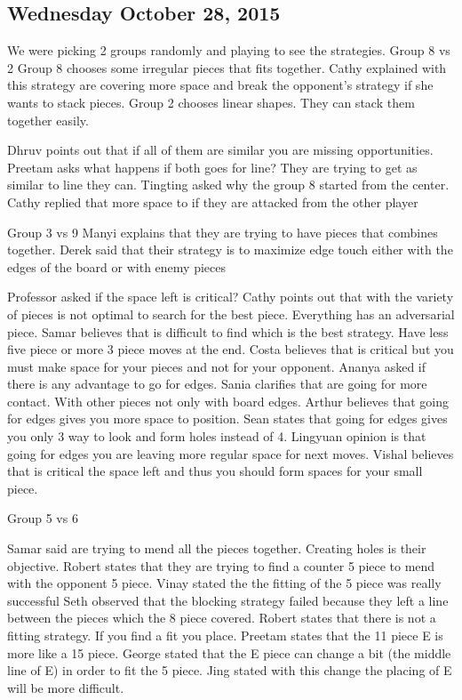 \subsection{Wednesday October 28, 2015}
We were picking 2 groups randomly and playing to see the strategies.
Group 8 vs 2
Group 8 chooses some irregular pieces that fits together.
Cathy explained with this strategy are covering more space and break the opponent’s strategy if she wants to stack pieces.
Group 2 chooses linear shapes. They can stack them together easily.

Dhruv points out that if all of them are similar you are missing opportunities.
Preetam asks what happens if both goes for line? They are trying to get as similar to line they can.
Tingting asked why the group 8 started from the center.
Cathy replied that more space to if they are attacked from the other player

Group 3 vs 9
Manyi explains that they are trying to have pieces that combines together.
Derek said that their strategy is to maximize edge touch either with the edges of the board or with enemy pieces

Professor asked if the space left is critical?
Cathy points out that with the variety of pieces is not optimal to search for the best piece. Everything has an adversarial piece.
Samar believes that is difficult to find which is the best strategy. Have less five piece or more 3 piece moves at the end.
Costa believes that is critical but you must make space for your pieces and not for your opponent.
Ananya asked if there is any advantage to go for edges.
Sania clarifies that are going for more contact. With other pieces not only with board edges.
Arthur believes that going for edges gives you more space to position.
Sean states that going for edges gives you only 3 way to look and form holes instead of 4.
Lingyuan opinion is that going for edges you are leaving more regular space for next moves.
Vishal believes that is critical the space left and thus you should form spaces for your small piece.

Group 5 vs 6

Samar said are trying to mend all the pieces together. Creating holes is their objective.
Robert states that they are trying to find a counter 5 piece to mend with the opponent 5 piece.
Vinay stated the the fitting of the 5 piece was really successful
Seth observed that the blocking strategy failed because they left a line between the pieces which the 8 piece covered.
Robert states that there is not a fitting strategy. If you find a fit you place.
Preetam states that the 11 piece E is more like a 15 piece.
George stated that the E piece can change a bit (the middle line of E) in order to fit the 5 piece.
Jing stated with this change the placing of E will be more difficult.

